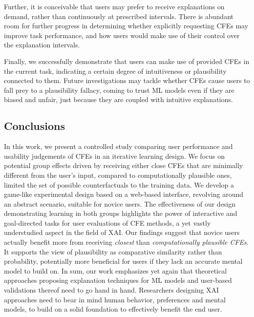 Further, it is conceivable that users may prefer to receive explanations on demand, rather than continuously at prescribed intervals.
There is abundant room for further progress in determining whether explicitly requesting \glspl{CFE} may improve task performance, and how users would make use of their control over the explanation intervals.

Finally, we successfully demonstrate that users can make use of provided \glspl{CFE} in the current task, indicating a certain degree of intuitiveness or plausibility connected to them. 
Future investigations may tackle whether \glspl{CFE} cause users to fall prey to a plausibility fallacy, coming to trust ML models even if they are biased and unfair, just because they are coupled with intuitive explanations.

\subsection{Conclusions}\label{subsec:conclusion}
In this work, we present a controlled study comparing user performance and usability judgements of \glspl{CFE} in an iterative learning design.
We focus on potential group effects driven by receiving either close \glspl{CFE} that are minimally different from the user’s input, compared to computationally plausible ones, limited the set of possible counterfactuals to the training data.
We develop a game-like experimental design based on a web-based interface, revolving around an abstract scenario, suitable for novice users.
The effectiveness of our design demonstrating learning in both groups highlights the power of interactive and goal-directed tasks for user evaluations of \gls{CFE} methods, a yet vastly understudied aspect in the field of \gls{XAI}.
Our findings suggest that novice users actually benefit more from receiving \textit{closest} than \textit{computationally plausible \glspl{CFE}}.
It supports the view of plausibility as comparative similarity rather than probability, potentially more beneficial for users if they lack an accurate mental model to build on.
In sum, our work emphasizes yet again that theoretical approaches proposing explanation techniques for \gls{ML} models and user-based validations thereof need to go hand in hand.
Researchers designing \gls{XAI} approaches need to bear in mind human behavior, preferences and mental models, to build on a solid foundation to effectively benefit the end user.

